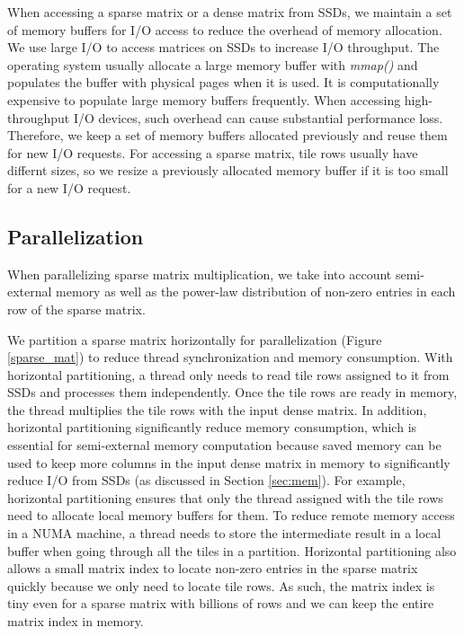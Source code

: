 When accessing a sparse matrix or a dense matrix from SSDs, we maintain a set of
memory buffers for I/O access to reduce the overhead of memory allocation.
We use large I/O to access matrices on SSDs to increase I/O throughput.
The operating system usually allocate a large memory buffer with \textit{mmap()}
and populates the buffer with physical pages when it is used. It is
computationally expensive to populate
large memory buffers frequently. When accessing high-throughput I/O devices,
such overhead can cause substantial performance loss. Therefore, we keep a set
of memory buffers allocated previously and reuse them for new I/O requests.
For accessing a sparse matrix, tile rows usually have differnt sizes, so we resize
a previously allocated memory buffer if it is too small for a new I/O request.

\subsection{Parallelization}
When parallelizing sparse matrix multiplication, we take into account
semi-external memory as well as the power-law distribution of non-zero entries
in each row of the sparse matrix.

We partition a sparse matrix horizontally for parallelization (Figure
\ref{sparse_mat}) to reduce thread synchronization and memory consumption.
With horizontal partitioning, a thread only needs to read tile rows assigned
to it from SSDs and processes them independently. Once the tile rows
are ready in memory, the thread multiplies the tile rows with the input
dense matrix. In addition, horizontal partitioning significantly reduce memory
consumption, which is essential for semi-external memory computation because
saved memory can be used to keep more columns in the input dense matrix in
memory to significantly reduce I/O from SSDs (as discussed in Section
\ref{sec:mem}). For example, horizontal partitioning ensures that
only the thread assigned with the tile rows need to allocate local memory buffers
for them. To reduce remote memory access in a NUMA machine, a thread needs to
store the intermediate result in a local buffer when going through all the tiles
in a partition. Horizontal partitioning also allows a small matrix index to
locate non-zero entries in the sparse matrix quickly because we only need to
locate tile rows. As such,
the matrix index is tiny even for a sparse matrix with billions of rows
and we can keep the entire matrix index in memory.

